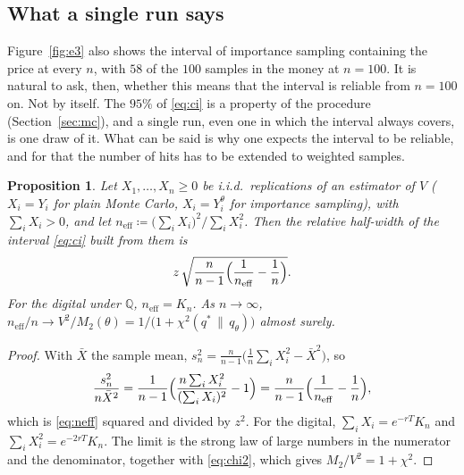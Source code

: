 \documentclass[11pt,a4paper]{article}
\theoremstyle{plain}
\newtheorem{proposition}[theorem]{Proposition}
\theoremstyle{definition}
\theoremstyle{remark}
\newcommand{\Q}{\mathbb{Q}}
\newcommand{\1}{\mathbf{1}}
\newcommand{\eqdef}{\coloneqq}
\begin{document}
\subsection{What a single run says}
\label{subsec:single-run}

Figure~\ref{fig:e3} also shows the interval of importance sampling containing the price at every $n$, with $58$ of the $100$ samples in the money at $n = 100$. It is natural to ask, then, whether this means that the interval is reliable from $n = 100$ on. Not by itself. The $95\%$ of \eqref{eq:ci} is a property of the procedure (Section~\ref{sec:mc}), and a single run, even one in which the interval always covers, is one draw of it. What can be said is why one expects the interval to be reliable, and for that the number of hits has to be extended to weighted samples.

\begin{proposition}\label{prop:neff}
Let $X_1, \dots, X_n \ge 0$ be i.i.d.\ replications of an estimator of $V$ ($X_i = Y_i$ for plain Monte Carlo, $X_i = Y_i^\theta$ for importance sampling), with $\sum_i X_i > 0$, and let $n_{\mathrm{eff}} \eqdef \bigl(\sum_i X_i\bigr)^2/\sum_i X_i^2$. Then the relative half-width of the interval \eqref{eq:ci} built from them is
\begin{equation}\label{eq:neff}
  z\,\sqrt{\frac{n}{n-1}\Bigl(\frac{1}{n_{\mathrm{eff}}} - \frac1n\Bigr)} .
\end{equation}
For the digital under $\Q$, $n_{\mathrm{eff}} = K_n$. As $n \to \infty$, $n_{\mathrm{eff}}/n \to V^2/M_2(\theta) = 1/\bigl(1 + \chi^2(q^* \,\|\, q_\theta)\bigr)$ almost surely.
\end{proposition}

\begin{proof}
With $\bar X$ the sample mean, $s_n^2 = \frac{n}{n-1}\bigl(\frac1n\sum_i X_i^2 - \bar X^2\bigr)$, so
\[
  \frac{s_n^2}{n\bar X^2} = \frac{1}{n-1}\Bigl(\frac{n\sum_i X_i^2}{(\sum_i X_i)^2} - 1\Bigr) = \frac{n}{n-1}\Bigl(\frac{1}{n_{\mathrm{eff}}} - \frac1n\Bigr),
\]
which is \eqref{eq:neff} squared and divided by $z^2$. For the digital, $\sum_i X_i = e^{-rT}K_n$ and $\sum_i X_i^2 = e^{-2rT}K_n$. The limit is the strong law of large numbers in the numerator and the denominator, together with \eqref{eq:chi2}, which gives $M_2/V^2 = 1 + \chi^2$.
\end{proof}
\end{document}
